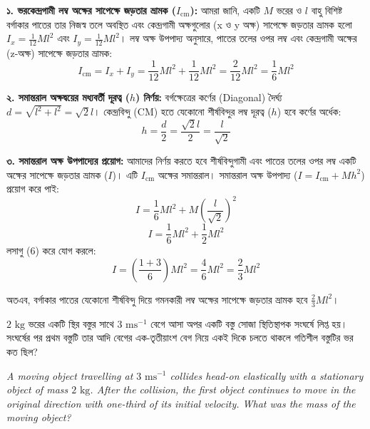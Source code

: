 \documentclass[12pt, a4paper]{article}
\begin{document}
{\begin{tcolorbox}[solutionbox={সমাধান (Solution)}]
\vspace{0.5em}
\textbf{১. ভরকেন্দ্রগামী লম্ব অক্ষের সাপেক্ষে জড়তার ভ্রামক ($I_{\text{cm}}$):}
আমরা জানি, একটি $M$ ভরের ও $l$ বাহু বিশিষ্ট বর্গাকার পাতের তার নিজস্ব তলে অবস্থিত এবং কেন্দ্রগামী অক্ষগুলোর (x ও y অক্ষ) সাপেক্ষে জড়তার ভ্রামক হলো $I_x = \frac{1}{12} Ml^2$ এবং $I_y = \frac{1}{12} Ml^2$। 
লম্ব অক্ষ উপপাদ্য অনুসারে, পাতের তলের ওপর লম্ব এবং কেন্দ্রগামী অক্ষের (z-অক্ষ) সাপেক্ষে জড়তার ভ্রামক:
$$I_{\text{cm}} = I_x + I_y = \frac{1}{12} M l^2 + \frac{1}{12} M l^2 = \frac{2}{12} M l^2 = \frac{1}{6} M l^2$$

\vspace{0.5em}
\textbf{২. সমান্তরাল অক্ষদ্বয়ের মধ্যবর্তী দূরত্ব ($h$) নির্ণয়:}
বর্গক্ষেত্রের কর্ণের (Diagonal) দৈর্ঘ্য $d = \sqrt{l^2 + l^2} = \sqrt{2}l$।
কেন্দ্রবিন্দু (CM) হতে যেকোনো শীর্ষবিন্দুর লম্ব দূরত্ব ($h$) হবে কর্ণের অর্ধেক:
$$h = \frac{d}{2} = \frac{\sqrt{2}l}{2} = \frac{l}{\sqrt{2}}$$

\vspace{0.5em}
\textbf{৩. সমান্তরাল অক্ষ উপপাদ্যের প্রয়োগ:}
আমাদের নির্ণয় করতে হবে শীর্ষবিন্দুগামী এবং পাতের তলের ওপর লম্ব একটি অক্ষের সাপেক্ষে জড়তার ভ্রামক ($I$)। এটি $I_{\text{cm}}$ অক্ষের সমান্তরাল। সমান্তরাল অক্ষ উপপাদ্য ($I = I_{\text{cm}} + Mh^2$) প্রয়োগ করে পাই:
$$I = \frac{1}{6} M l^2 + M \left(\frac{l}{\sqrt{2}}\right)^2$$
$$I = \frac{1}{6} M l^2 + \frac{1}{2} M l^2$$
লসাগু ($6$) করে যোগ করলে:
$$I = \left(\frac{1 + 3}{6}\right) M l^2 = \frac{4}{6} M l^2 = \frac{2}{3} M l^2$$

অতএব, বর্গাকার পাতের যেকোনো শীর্ষবিন্দু দিয়ে গমনকারী লম্ব অক্ষের সাপেক্ষে জড়তার ভ্রামক হবে $\frac{2}{3} M l^2$।
\end{tcolorbox}
\vspace{1em}

\begin{tcolorbox}[questionbox={প্রশ্ন (Question) 47}]
\noindent
$2\text{ kg}$ ভরের একটি স্থির বস্তুর সাথে $3\text{ ms}^{-1}$ বেগে আসা অপর একটি বস্তু সোজা স্থিতিস্থাপক সংঘর্ষে লিপ্ত হয়। সংঘর্ষের পর প্রথম বস্তুটি তার আদি বেগের এক-তৃতীয়াংশ বেগ নিয়ে একই দিকে চলতে থাকলে গতিশীল বস্তুটির ভর কত ছিল?

\vspace{0.8em}
\begin{english}
\noindent\textit{\color{darkgray}
A moving object travelling at $3\text{ ms}^{-1}$ collides head-on elastically with a stationary object of mass $2\text{ kg}$. After the collision, the first object continues to move in the original direction with one-third of its initial velocity. What was the mass of the moving object?
}
\end{english}
\end{tcolorbox}

}
\end{document}
